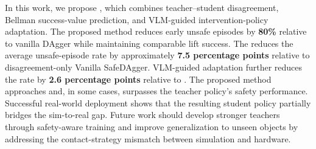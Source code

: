 In this work, we propose \methodname, which combines teacher--student
disagreement, Bellman success-value prediction, and VLM-guided intervention-policy
adaptation. The proposed method reduces early unsafe episodes by \textbf{80\%}
relative to vanilla DAgger while maintaining comparable lift success. The
\methodname reduces the average unsafe-episode rate by approximately
\textbf{7.5 percentage points} relative to disagreement-only Vanilla SafeDAgger.
VLM-guided adaptation further reduces the rate by \textbf{2.6 percentage points}
relative to \dexsafedagger.
The proposed method approaches and, in some cases, surpasses the teacher policy's
safety performance. Successful real-world deployment shows that the resulting
student policy partially bridges the sim-to-real gap.
Future work should develop stronger teachers through safety-aware training
and improve generalization to unseen objects by addressing the
contact-strategy mismatch between simulation and hardware.

